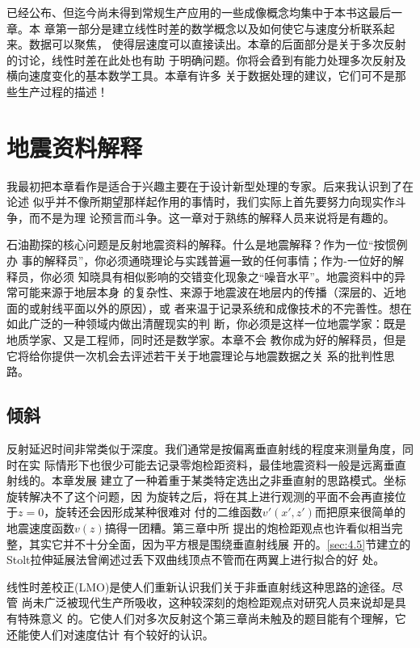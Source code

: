 已经公布、但迄今尚未得到常规生产应用的一些成像概念均集中于本书这最后一章。本
章第一部分是建立线性时差的数学概念以及如何使它与速度分析联系起来。数据可以聚焦，
使得层速度可以直接读出。本章的后面部分是关于多次反射的讨论，线性时差在此处也有助
于明确问题。你将会孴到有能力处理多次反射及横向速度变化的基本数学工具。本章有许多
关于数据处理的建议，它们可不是那些生产过程的描述！

\section{地震资料解释}
\label{sec:5.0.1}

我最初把本章看作是适合于兴趣主要在于设计新型处理的专家。后来我认识到了在论述
似乎并不像所期望那样起作用的事情时，我们实际上首先要努力向现实作斗争，而不是为理
论预言而斗争。这一章对于熟练的解释人员来说将是有趣的。

石油勘探的核心问题是反射地震资料的解释。什么是地震解释？作为一位“按惯例办
事的解释员”，你必须通晓理论与实践普遍一致的任何事情；作为-一位好的解释员，你必须
知晓具有相似影响的交错变化现象之“噪音水平”。地震资料中的异常可能来源于地层本身
的复杂性、来源于地震波在地层内的传播（深层的、近地面的或射线平面以外的原因），或
者来温于记录系统和成像技术的不完善性。想在如此广泛的一种领域内做出清醒现实的判
断，你必须是这样一位地震学家：既是地质学家、又是工程师，同时还是数学家。本章不会
教你成为好的解释员，但是它将给你提供一次机会去评述若干关于地震理论与地震数据之关
系的批判性思路。

\subsection{倾斜}
\label{sec:5.0.2}

反射延迟时间非常类似于深度。我们通常是按偏离垂直射线的程度来测量角度，同时在实
际情形下也很少可能去记录零炮检距资料，最佳地震资料一般是远离垂直射线的。本章发展
建立了一种着重于某类特定选出之非垂直射的思路模式。坐标旋转解决不了这个问题，因
为旋转之后，将在其上进行观测的平面不会再直接位于$z=0$，旋转还会因形成某种很难对
付的二维函数$v'(x',z')$而把原来很简单的地震速度函数$v(z)$搞得一团糟。第三章中所
提出的炮检距观点也许看似相当完整，其实它并不十分全面，因为平方根是围绕垂直射线展
开的。\ref{sec:4.5}节建立的Stolt拉伸延展法曾阐述过丢下双曲线顶点不管而在两翼上进行拟合的好
处。

线性时差校正(LMO)是使人们重新认识我们关于非垂直射线这种思路的途径。尽管
尚未广泛被现代生产所吸收，这种较深刻的炮检距观点对研究人员来说却是具有特殊意义
的。它使人们对多次反射这个第三章尚未触及的题目能有个理解，它还能使人们对速度估计
有个较好的认识。

